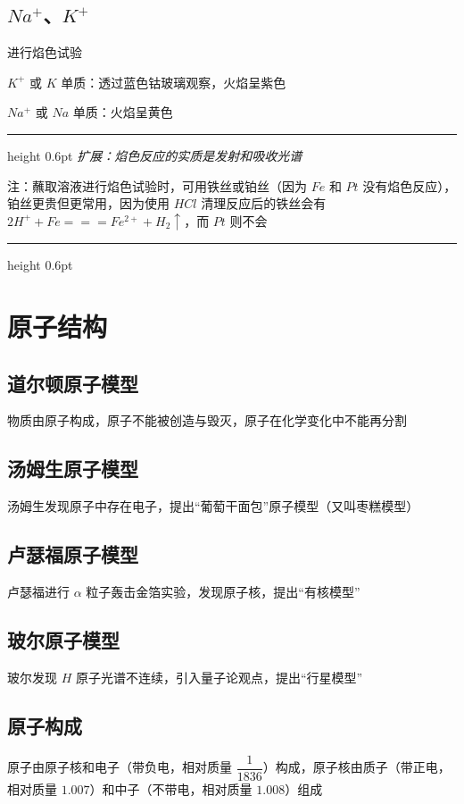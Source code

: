 \documentclass[UTF8,zihao=-4,openany]{ctexbook}
\newenvironment{notebox}
  {\par\smallskip\noindent\begingroup\begin{minipage}{\linewidth}\color{noteframe}\hrule height 0.6pt\smallskip\color{black}\itshape}
  {\par\smallskip\color{noteframe}\hrule height 0.6pt\end{minipage}\endgroup\par\smallskip}
\begin{document}
\subsection{$Na^+$、$K^+$}
进行焰色试验\par

$K^+$ 或 $K$ 单质：透过蓝色钴玻璃观察，火焰呈紫色\par

$Na^+$ 或 $Na$ 单质：火焰呈黄色\par
\begin{notebox}
扩展：焰色反应的实质是发射和吸收光谱\par
注：蘸取溶液进行焰色试验时，可用铁丝或铂丝（因为 $Fe$ 和 $Pt$ 没有焰色反应），铂丝更贵但更常用，因为使用 $HCl$ 清理反应后的铁丝会有 $2H^++Fe=\!=\!=Fe^{2+}+H_2\uparrow$，而 $Pt$ 则不会\par
\end{notebox}
\section{原子结构}
\subsection{道尔顿原子模型}
物质由原子构成，原子不能被创造与毁灭，原子在化学变化中不能再分割\par
\subsection{汤姆生原子模型}
汤姆生发现原子中存在电子，提出“葡萄干面包”原子模型（又叫枣糕模型）\par
\subsection{卢瑟福原子模型}
卢瑟福进行 $\alpha$ 粒子轰击金箔实验，发现原子核，提出“有核模型”\par
\subsection{玻尔原子模型}
玻尔发现 $H$ 原子光谱不连续，引入量子论观点，提出“行星模型”\par
\subsection{原子构成}
原子由原子核和电子（带负电，相对质量 $\dfrac{1}{1836}$）构成，原子核由质子（带正电，相对质量 $1.007$）和中子（不带电，相对质量 $1.008$）组成\par
\end{document}
